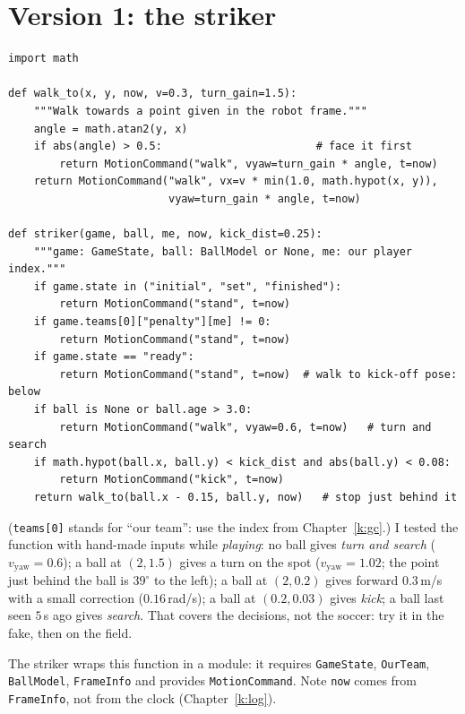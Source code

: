 \section*{Version 1: the striker}
\begin{verbatim}
import math

def walk_to(x, y, now, v=0.3, turn_gain=1.5):
    """Walk towards a point given in the robot frame."""
    angle = math.atan2(y, x)
    if abs(angle) > 0.5:                        # face it first
        return MotionCommand("walk", vyaw=turn_gain * angle, t=now)
    return MotionCommand("walk", vx=v * min(1.0, math.hypot(x, y)),
                         vyaw=turn_gain * angle, t=now)

def striker(game, ball, me, now, kick_dist=0.25):
    """game: GameState, ball: BallModel or None, me: our player index."""
    if game.state in ("initial", "set", "finished"):
        return MotionCommand("stand", t=now)
    if game.teams[0]["penalty"][me] != 0:
        return MotionCommand("stand", t=now)
    if game.state == "ready":
        return MotionCommand("stand", t=now)  # walk to kick-off pose: below
    if ball is None or ball.age > 3.0:
        return MotionCommand("walk", vyaw=0.6, t=now)   # turn and search
    if math.hypot(ball.x, ball.y) < kick_dist and abs(ball.y) < 0.08:
        return MotionCommand("kick", t=now)
    return walk_to(ball.x - 0.15, ball.y, now)   # stop just behind it
\end{verbatim}
(\texttt{teams[0]} stands for ``our team'': use the index from Chapter~\ref{k:gc}.) I tested the function with hand-made inputs while \emph{playing}: no ball gives \emph{turn and search} ($v_{\text{yaw}}=0.6$); a ball at $(2,1.5)$ gives a turn on the spot ($v_{\text{yaw}}=1.02$; the point just behind the ball is $39^\circ$ to the left); a ball at $(2,0.2)$ gives forward $0.3$\,m/s with a small correction ($0.16$\,rad/s); a ball at $(0.2,0.03)$ gives \emph{kick}; a ball last seen $5$\,s ago gives \emph{search}. That covers the decisions, not the soccer: try it in the fake, then on the field.

The striker wraps this function in a module: it requires \texttt{GameState}, \texttt{OurTeam}, \texttt{BallModel}, \texttt{FrameInfo} and provides \texttt{MotionCommand}. Note \texttt{now} comes from \texttt{FrameInfo}, not from the clock (Chapter~\ref{k:log}).

